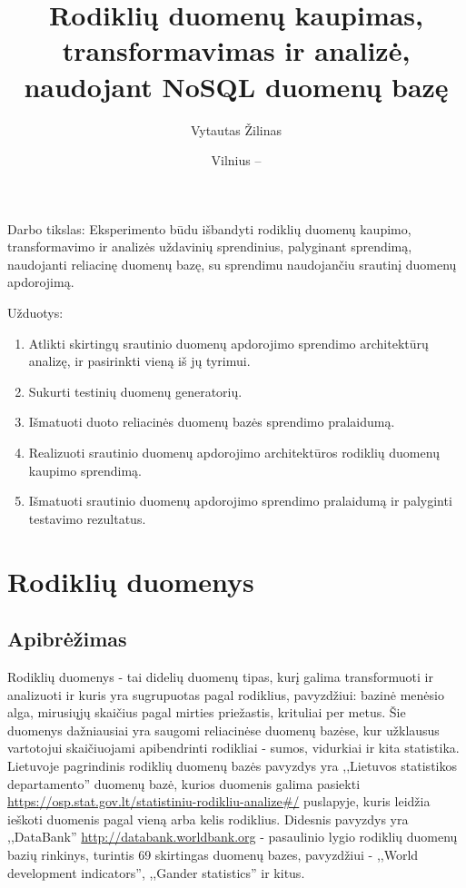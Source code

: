 \documentclass{VUMIFPSkursinis}
\title{Rodiklių duomenų kaupimas, transformavimas ir analizė, naudojant NoSQL duomenų bazę}
\author{Vytautas Žilinas}
\date{Vilnius – \the\year}
\begin{document}
	
\maketitle
\cleardoublepage{}
\setcounter{page}{2}

\tableofcontents


Darbo tikslas: Eksperimento būdu išbandyti rodiklių duomenų kaupimo, transformavimo ir analizės uždavinių sprendinius, palyginant sprendimą, naudojanti reliacinę duomenų bazę, su sprendimu naudojančiu srautinį duomenų apdorojimą.

Užduotys:
\begin{enumerate}
    \item Atlikti skirtingų srautinio duomenų apdorojimo sprendimo architektūrų analizę, ir pasirinkti vieną iš jų tyrimui.
    \item Sukurti testinių duomenų generatorių.
    \item Išmatuoti duoto reliacinės duomenų bazės sprendimo pralaidumą.
    \item Realizuoti srautinio duomenų apdorojimo architektūros rodiklių duomenų kaupimo sprendimą.
    \item Išmatuoti srautinio duomenų apdorojimo sprendimo pralaidumą ir palyginti testavimo rezultatus.
\end{enumerate}


\section{Rodiklių duomenys}

\subsection{Apibrėžimas}

Rodiklių duomenys - tai didelių duomenų tipas, kurį galima transformuoti ir analizuoti ir kuris yra sugrupuotas pagal rodiklius, 
pavyzdžiui: bazinė menėsio alga, mirusiųjų skaičius pagal mirties priežastis, krituliai per metus. Šie duomenys dažniausiai yra saugomi reliacinėse duomenų bazėse, 
kur užklausus vartotojui skaičiuojami apibendrinti rodikliai - sumos, vidurkiai ir kita statistika.
Lietuvoje pagrindinis rodiklių duomenų bazės pavyzdys yra ,,Lietuvos statistikos departamento'' duomenų bazė, kurios duomenis galima pasiekti
\url{https://osp.stat.gov.lt/statistiniu-rodikliu-analize#/} puslapyje, kuris leidžia ieškoti duomenis pagal vieną arba kelis rodiklius. Didesnis pavyzdys yra ,,DataBank''
\url{http://databank.worldbank.org} - pasaulinio lygio rodiklių duomenų bazių rinkinys, turintis 69 skirtingas duomenų bazes, pavyzdžiui - ,,World development indicators'',
,,Gander statistics'' ir kitus\cite{databank-stats}.
\end{document}
